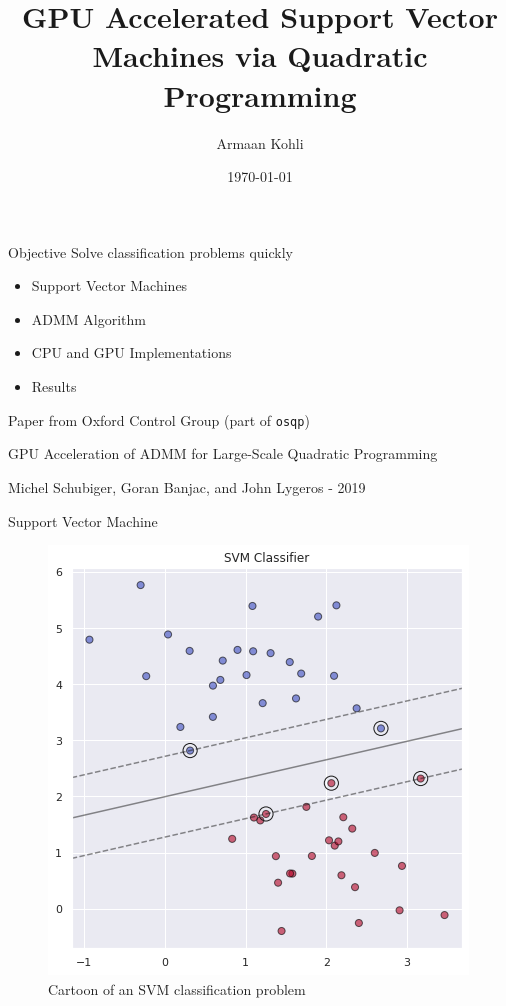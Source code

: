 \documentclass[10pt]{beamer}
\title{GPU Accelerated Support Vector Machines via Quadratic Programming}
\date{\today}
\author{Armaan Kohli}
\institute{The Cooper Union \\ ECE453}
\begin{document}
\maketitle

\begin{frame}[fragile]{Objective}
Solve classification problems quickly
 \begin{itemize}
		\item Support Vector Machines
     	\item ADMM Algorithm
     	\item CPU and GPU Implementations
     	\item Results
	\end{itemize}
Paper from Oxford Control Group (part of \texttt{osqp}) 

GPU Acceleration of ADMM for Large-Scale Quadratic Programming \cite{cuosqp}

Michel Schubiger, Goran Banjac, and John Lygeros - 2019

  
\end{frame}


\begin{frame}[fragile]{Support Vector Machine}
\begin{figure}
    \includegraphics[scale=.4]{./media/svm.png}
    \caption{Cartoon of an SVM classification problem}
  \end{figure}
\end{frame}
\end{document}
